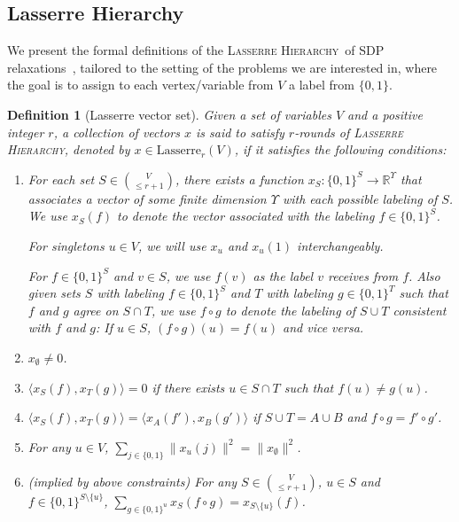 \documentclass{article}
\newtheorem{definition}{Definition}[section]
\newcommand{\R}{\mathbb{R}}
\let\es=\emptyset
\newcommand{\lasserreii}[2]{\mathrm{Lasserre}_{#1}(#2)}
\newcommand{\xvec}{\vec{x}} \newcommand{\yvec}{\vec{y}} \newcommand{\xmat}{\vec{X}} \newcommand{\ymat}{\vec{Y}} \newcommand{\zmat}{\vec{Z}}
\newcommand{\lh}{\textsc{\sf Lasserre Hierarchy}}
\def\ngap{}
\def\vec{}
\begin{document}
\subsection{Lasserre Hierarchy}
\label{sec:lasserre-defn}
We present the formal definitions of the \lh\ of SDP
relaxations~\cite{Las02}, tailored to the setting of the problems we
are interested in, where the goal is to assign to each vertex/variable
from $V$ a label from $\{0,1\}$.
\def\dim{\Upsilon}
\begin{definition}[Lasserre vector set]
\label{def:las-sdp}
Given a set of variables $V$ and a positive integer $r$, a collection
of vectors $\xvec$ is said to satisfy $r$-rounds of \lh, denoted by
$\xvec \in \lasserreii{r}{V}$, if it satisfies the following conditions:
\begin{enumerate}
\item For each set $S\in\binom{V}{\le r+1}$, there exists a function
  $\xvec_S:\{0,1\}^{S}\to \R^\dim$ that associates a vector of some
  finite dimension $\dim$ with each possible labeling of $S$.  We use
  $\xvec_S(f)$ to denote the vector associated with the labeling $f\in
  \{0,1\}^S$.

  For singletons $u\in V$, we will use $\xvec_u$ and $\xvec_u(1)$
  interchangeably.

  For $f \in \{0,1\}^S$ and $v\in S$, we use $f(v)$ as the label $v$
  receives from $f$.  Also given sets $S$ with labeling $f\in
  \{0,1\}^S$ and $T$ with labeling $g\in\{0,1\}^T$ such that $f$ and
  $g$ agree on $S\cap T$, we use $f\circ g$ to denote the labeling of
  $S\cup T$ consistent with $f$ and $g$: If $u\in S$, $(f\circ g)(u) =
  f(u)$ and vice versa.
\item $\xvec_{\es} \neq 0$.
\item $\langle \xvec_S(f), \xvec_T(g)\rangle = 0$ if there exists
  $u\in S\cap T$ such that $f(u)\neq g(u)$.
\item \label{def:las-sdp:consistent} $\langle \xvec_S(f),
  \xvec_T(g)\rangle = \langle \xvec_A(f'), \xvec_B(g')\rangle$ if
  $S\cup T=A\cup B$ and $f\circ g = f'\circ g'$.
\item For any $u\in V$, $\sum_{j\in \{0,1\}} \|\xvec_u(j)\|^2 =
  \|\xvec_\es\|^2$.
\item (implied by above constraints) For any $S\in\binom{V}{\le r+1}$,
  $u\in S$ and $f\in \{0,1\}^{S\setminus\{u\}}$, $\sum_{g\in
    \{0,1\}^u} \xvec_{S}(f\circ g) = \xvec_{S\setminus\{u\}} (f)$.
\end{enumerate} 
\end{definition}
\ngap
\end{document}

